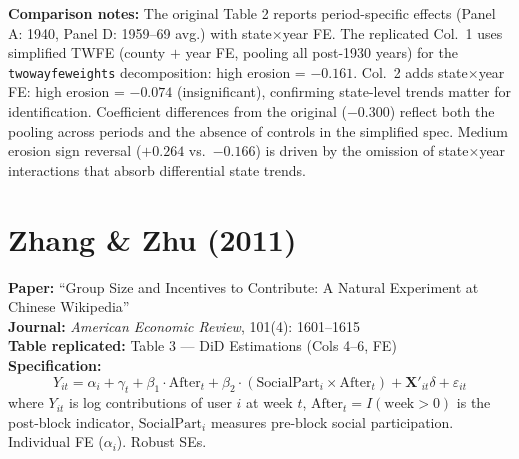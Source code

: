\documentclass[11pt,a4paper]{article}
\begin{document}
\vspace{1cm}
\textbf{Comparison notes:} The original Table 2 reports period-specific effects (Panel A: 1940, Panel D: 1959--69 avg.) with state$\times$year FE. The replicated Col.\ 1 uses simplified TWFE (county $+$ year FE, pooling all post-1930 years) for the \texttt{twowayfeweights} decomposition: high erosion = $-0.161$. Col.\ 2 adds state$\times$year FE: high erosion = $-0.074$ (insignificant), confirming state-level trends matter for identification. Coefficient differences from the original ($-0.300$) reflect both the pooling across periods and the absence of controls in the simplified spec. Medium erosion sign reversal ($+0.264$ vs.\ $-0.166$) is driven by the omission of state$\times$year interactions that absorb differential state trends.

\newpage

\section{Zhang \& Zhu (2011)}

\textbf{Paper:} ``Group Size and Incentives to Contribute: A Natural Experiment at Chinese Wikipedia''\\
\textbf{Journal:} \textit{American Economic Review}, 101(4): 1601--1615\\
\textbf{Table replicated:} Table 3 --- DiD Estimations (Cols 4--6, FE)\\
\textbf{Specification:}
\[
Y_{it} = \alpha_i + \gamma_t + \beta_1 \cdot \text{After}_t + \beta_2 \cdot (\text{SocialPart}_i \times \text{After}_t) + \mathbf{X}'_{it}\delta + \varepsilon_{it}
\]
where $Y_{it}$ is log contributions of user $i$ at week $t$, $\text{After}_t = I(\text{week} > 0)$ is the post-block indicator, $\text{SocialPart}_i$ measures pre-block social participation. Individual FE ($\alpha_i$). Robust SEs.

\vspace{0.3cm}
\noindent{}
\end{document}
